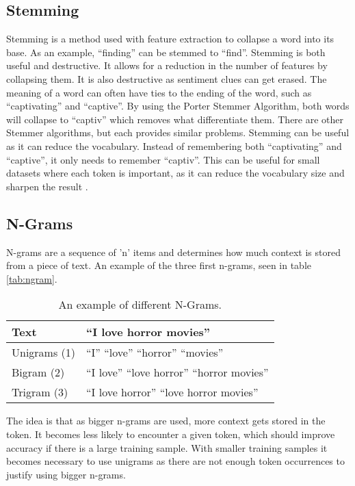 \subsection{Stemming}\label{subsec:Stem}
Stemming is a method used with feature extraction to collapse a word into its
base. As an example, ``finding'' can be stemmed to ``find''. Stemming
is both useful and destructive. It allows for a reduction in the number of
features by collapsing them. It is also destructive as sentiment clues can get
erased. The meaning of a word can often have ties to the ending of the word, such as
``captivating'' and ``captive''. By using the Porter Stemmer Algorithm, both
words will collapse to ``captiv'' which removes what differentiate them. There
are other Stemmer algorithms, but each provides similar problems. Stemming can
be useful as it can reduce the vocabulary. Instead of remembering both
``captivating'' and ``captive'', it only needs to remember ``captiv''. This
can be useful for small datasets where each token is important, as it can reduce
the vocabulary size and sharpen the result \citep[Ch 3.b]{Sentiment}.

\subsection{N-Grams}
N-grams are a sequence of 'n' items and determines how much context is stored
from a piece of text. An example of the three first n-grams, seen in
table \autoref{tab:ngram}.

\begin{table}[H]
\centering
\begin{tabular}{|l|l|}
\hline
Text & ``I love horror movies'' \\ \hline
Unigrams (1) &
``I'' ``love'' ``horror'' ``movies''
\\ \hline 
Bigram (2) &
``I love'' ``love horror'' ``horror movies''
\\ \hline
Trigram (3) &
``I love horror'' ``love horror movies''
\\ \hline
\end{tabular}
\caption{An example of different N-Grams.}
\label{tab:ngram}
\end{table}

The idea is that as bigger n-grams are used, more context gets stored in the
token. It becomes less likely to encounter a given token, which should
improve accuracy if there is a large training sample. With smaller training
samples it becomes necessary to use unigrams as there are not enough
token occurrences to justify using bigger n-grams.

